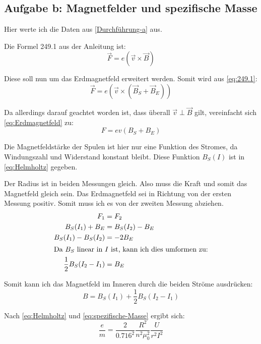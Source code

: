 \documentclass[11pt]{article}
\newcommand{\half}{\frac{1}{2}}
\begin{document}
\subsection{Aufgabe b: Magnetfelder und spezifische Masse}

\label{Auswertung-b}

Hier werte ich die Daten aus \ref{Durchführung-a} aus.

Die Formel 249.1 aus der Anleitung ist:
\begin{equation}
	\label{eq:249.1}
	\vec F = e \left( \vec v \times \vec B \right)
\end{equation}

Diese soll nun um das Erdmagnetfeld erweitert werden. Somit wird aus
\eqref{eq:249.1}:
\begin{equation}
	\label{eq:Erdmagnetfeld}
	\vec F = e \left( \vec v \times \left( \vec B_S + \vec B_E \right) \right)
\end{equation}

Da allerdings darauf geachtet worden ist, dass überall $\vec v \perp \vec B$
gilt, vereinfacht sich \eqref{eq:Erdmagnetfeld} zu:
\begin{equation}
	\label{eq:magnetische-Kraft}
	F = e v (B_S + B_E)
\end{equation}

Die Magnetfeldstärke der Spulen ist hier nur eine Funktion des Stromes, da
Windungszahl und Widerstand konstant bleibt. Diese Funktion $B_S(I)$ ist in
\eqref{eq:Helmholtz} gegeben.

Der Radius ist in beiden Messungen gleich. Also muss die Kraft und somit das
Magnetfeld gleich sein. Das Erdmagnetfeld sei in Richtung von der ersten
Messung positiv. Somit muss ich es von der zweiten Messung abziehen.
%
\begin{align*}
	F_1 &= F_2 \\
	B_S(I_1) + B_E &= B_S(I_2) - B_E \\
	B_S(I_1) - B_S(I_2) &= - 2 B_E \\
	\intertext{Da $B_S$ linear in $I$ ist, kann ich dies umformen zu:}
	\half B_S(I_2 - I_1) &= B_E \\
\end{align*}

Somit kann ich das Magnetfeld im Inneren durch die beiden Ströme ausdrücken:
\begin{equation}
	\label{eq:Magnetfeld-im-Inneren}
	B = B_S(I_1) + \half B_S(I_2 - I_1)
\end{equation}

Nach \eqref{eq:Helmholtz} und \eqref{eq:spezifische-Masse} ergibt sich:
\begin{equation}
	\label{eq:fit}
	\frac em = \frac{2}{0.716^2} \frac{R^2}{n^2 \mu_0^2} \frac{U}{r^2 I^2}
\end{equation}
\end{document}
